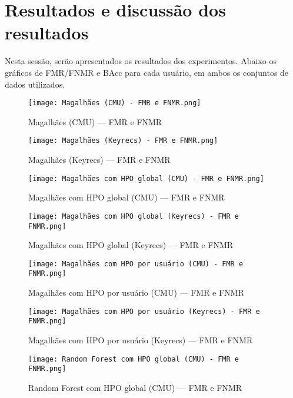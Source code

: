\section{Resultados e discussão dos resultados}\label{sec:resultados}

Nesta sessão, serão apresentados os resultados dos experimentos. Abaixo os gráficos de FMR/FNMR e BAcc para cada usuário, em ambos os conjuntos de dados utilizados.


\begin{figure}[H]
    \caption{Magalhães (CMU) --- FMR e FNMR}\label{fig:Magalhães (CMU) --- FMR e FNMR}
    \centering
    \texttt{[image: Magalhães (CMU) - FMR e FNMR.png]}
\end{figure}
\begin{figure}[H]
    \caption{Magalhães (Keyrecs) --- FMR e FNMR}\label{fig:Magalhães (Keyrecs) --- FMR e FNMR}
    \centering
    \texttt{[image: Magalhães (Keyrecs) - FMR e FNMR.png]}
\end{figure}
\begin{figure}[H]
    \caption{Magalhães com HPO global (CMU) --- FMR e FNMR}\label{fig:Magalhães com HPO global (CMU) --- FMR e FNMR}
    \centering
    \texttt{[image: Magalhães com HPO global (CMU) - FMR e FNMR.png]}
\end{figure}
\begin{figure}[H]
    \caption{Magalhães com HPO global (Keyrecs) --- FMR e FNMR}\label{fig:Magalhães com HPO global (Keyrecs) --- FMR e FNMR}
    \centering
    \texttt{[image: Magalhães com HPO global (Keyrecs) - FMR e FNMR.png]}
\end{figure}
\begin{figure}[H]
    \caption{Magalhães com HPO por usuário (CMU) --- FMR e FNMR}\label{fig:Magalhães com HPO por usuário (CMU) --- FMR e FNMR}
    \centering
    \texttt{[image: Magalhães com HPO por usuário (CMU) - FMR e FNMR.png]}
\end{figure}
\begin{figure}[H]
    \caption{Magalhães com HPO por usuário (Keyrecs) --- FMR e FNMR}\label{fig:Magalhães com HPO por usuário (Keyrecs) --- FMR e FNMR}
    \centering
    \texttt{[image: Magalhães com HPO por usuário (Keyrecs) - FMR e FNMR.png]}
\end{figure}
\begin{figure}[H]
    \caption{Random Forest com HPO global (CMU) --- FMR e FNMR}\label{fig:Random Forest com HPO global (CMU) --- FMR e FNMR}
    \centering
    \texttt{[image: Random Forest com HPO global (CMU) - FMR e FNMR.png]}
\end{figure}
